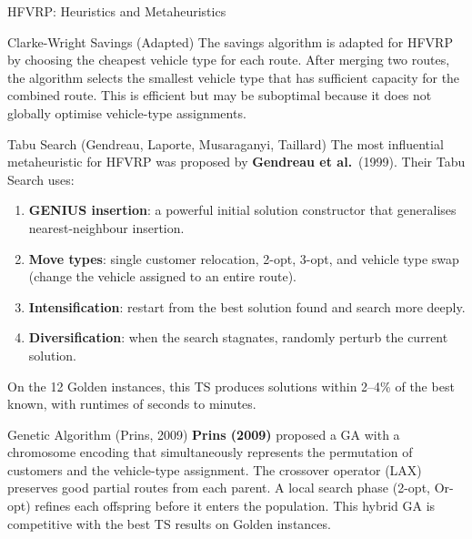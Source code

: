 \documentclass[aspectratio=169,10pt]{beamer}
\begin{document}
\begin{frame}[allowframebreaks]{HFVRP: Heuristics and Metaheuristics}

\begin{block}{Clarke-Wright Savings (Adapted)}
  The savings algorithm is adapted for HFVRP by choosing the cheapest vehicle
  type for each route.  After merging two routes, the algorithm selects the
  smallest vehicle type that has sufficient capacity for the combined route.
  This is efficient but may be suboptimal because it does not globally optimise
  vehicle-type assignments.
\end{block}

\begin{block}{Tabu Search (Gendreau, Laporte, Musaraganyi, Taillard)}
  The most influential metaheuristic for HFVRP was proposed by
  \textbf{Gendreau et al.}\ (1999).  Their Tabu Search uses:
  \begin{enumerate}
    \item \textbf{GENIUS insertion}: a powerful initial solution constructor
          that generalises nearest-neighbour insertion.
    \item \textbf{Move types}: single customer relocation, 2-opt, 3-opt,
          and vehicle type swap (change the vehicle assigned to an entire route).
    \item \textbf{Intensification}: restart from the best solution found and
          search more deeply.
    \item \textbf{Diversification}: when the search stagnates, randomly
          perturb the current solution.
  \end{enumerate}
  On the 12 Golden instances, this TS produces solutions within 2--4\% of the
  best known, with runtimes of seconds to minutes.
\end{block}

\framebreak

\begin{block}{Genetic Algorithm (Prins, 2009)}
  \textbf{Prins (2009)} proposed a GA with a chromosome encoding that
  simultaneously represents the permutation of customers and the vehicle-type
  assignment.  The crossover operator (LAX) preserves good partial routes
  from each parent.  A local search phase (2-opt, Or-opt) refines each
  offspring before it enters the population.  This hybrid GA is competitive
  with the best TS results on Golden instances.
\end{block}


\end{frame}
\end{document}
